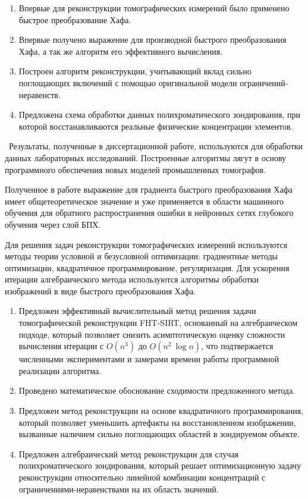 {\novelty}
\begin{enumerate}
  \item Впервые для реконструкции томографических измерений было применено быстрое преобразование Хафа.
  \item Впервые получено выражение для производной быстрого преобразования Хафа, а так же алгоритм его эффективного вычисления.
  \item Построен алгоритм реконструкции, учитывающий вклад сильно поглощающих включений с помощью оригинальной модели ограничений-неравенств.
  \item Предложена схема обработки данных полихроматического зондирования, при которой восстанавливаются реальные физические концентрации элементов.
\end{enumerate}

{\influence} ~Результаты, полученные в диссертационной работе, используются для обработки данных лабораторных исследований. Построенные алгоритмы лягут в основу программного обеспечения новых моделей промышленных томографов.

Полученное в работе выражение для градиента быстрого преобразования Хафа имеет общетеоретическое значение и уже применяется в области машинного обучения для обратного распространения ошибки в нейронных сетях глубокого обучения через слой БПХ.

{\methods}
Для решения задач реконструкции томографических измерений используются методы теории условной и безусловной оптимизации: градиентные методы оптимизации, квадратичное программирование, регуляризация.
Для ускорения итерации алгебраического метода используются алгоритмы обработки изображений в виде быстрого преобразования Хафа.


{}
\begin{enumerate}
  \item Предложен эффективный вычислительный метод решения задачи томографической реконструкции FHT-SIRT, основанный на алгебраическом подходе, который позволяет снизить асимптотическую оценку сложности вычисления итерации с $O(n^3)$ до $O(n^2~\log n)$, что подтвержается численными экспериментами и замерами времени работы программной реализации алгоритма.
  \item Проведено математическое обоснование сходимости предложенного метода.
  \item Предложен метод реконструкции на основе квадратичного программирования, который позволяет уменьшить артефакты на восстановленном изображении, вызванные наличием сильно поглощающих областей в зондируемом объекте.
  \item Предложен алгебраический метод реконструкции для случая полихроматического зондирования, который решает оптимизационную задачу реконструкции относительно линейной комбинации концентраций с ограничениями-неравенствами на их область значений.
\end{enumerate}



